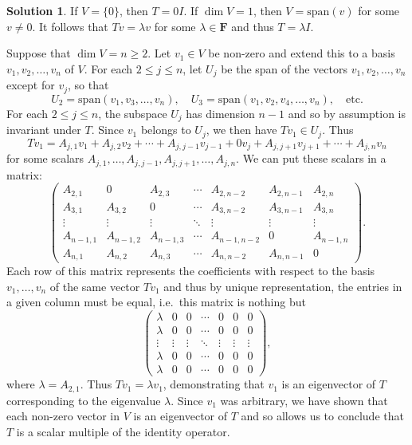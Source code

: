 \documentclass[12pt]{article}
\theoremstyle{definition}
\theoremstyle{exercise}
\theoremstyle{solution}
\newtheorem*{solution}{Solution}
\newcommand{\Span}{\text{span}}
\newcommand{\F}{\mathbf{F}}
\begin{document}
\begin{solution}
    If \( V = \{ 0 \} \), then \( T = 0I \). If \( \dim V = 1 \), then \( V = \Span (v) \) for some \( v \neq 0 \). It follows that \( Tv = \lambda v \) for some \( \lambda \in \F \) and thus \( T = \lambda I \).

    Suppose that \( \dim V = n \geq 2 \). Let \( v_1 \in V \) be non-zero and extend this to a basis \( v_1, v_2, \ldots, v_n \) of \( V \). For each \( 2 \leq j \leq n \), let \( U_j \) be the span of the vectors \( v_1, v_2, \ldots, v_n \) except for \( v_j \), so that
    \[
        U_2 = \Span (v_1, v_3, \ldots, v_n), \quad U_3 = \Span(v_1, v_2, v_4, \ldots, v_n), \quad \text{etc.}
    \]
    For each \( 2 \leq j \leq n \), the subspace \( U_j \) has dimension \( n - 1 \) and so by assumption is invariant under \( T \). Since \( v_1 \) belongs to \( U_j \), we then have \( Tv_1 \in U_j \). Thus
    \[
        Tv_1 = A_{j,1} v_1 + A_{j,2} v_2 + \cdots + A_{j,j-1} v_{j-1} + 0 v_j + A_{j,j+1} v_{j+1} + \cdots + A_{j,n} v_n
    \]
    for some scalars \( A_{j,1}, \ldots, A_{j,j-1}, A_{j,j+1}, \ldots, A_{j,n} \). We can put these scalars in a matrix:
    \[
        \begin{pmatrix}
            A_{2,1} & 0 & A_{2,3} & \cdots & A_{2,n-2} & A_{2,n-1} & A_{2,n} \\
            A_{3,1} & A_{3,2} & 0 & \cdots & A_{3,n-2} & A_{3,n-1} & A_{3,n} \\
            \vdots & \vdots & \vdots & \ddots & \vdots & \vdots & \vdots \\
            A_{n-1,1} & A_{n-1,2} & A_{n-1,3} & \cdots & A_{n-1,n-2} & 0 & A_{n-1,n} \\
            A_{n,1} & A_{n,2} & A_{n,3} & \cdots & A_{n,n-2} & A_{n,n-1} & 0
        \end{pmatrix}.
    \]
    Each row of this matrix represents the coefficients with respect to the basis \( v_1, \ldots, v_n \) of the same vector \( Tv_1 \) and thus by unique representation, the entries in a given column must be equal, i.e.\ this matrix is nothing but
    \[
        \begin{pmatrix}
            \lambda & 0 & 0 & \cdots & 0 & 0 & 0 \\
            \lambda & 0 & 0 & \cdots & 0 & 0 & 0 \\
            \vdots & \vdots & \vdots & \ddots & \vdots & \vdots & \vdots \\
            \lambda & 0 & 0 & \cdots & 0 & 0 & 0 \\
            \lambda & 0 & 0 & \cdots & 0 & 0 & 0
        \end{pmatrix},
    \]
    where \( \lambda = A_{2,1} \). Thus \( Tv_1 = \lambda v_1 \), demonstrating that \( v_1 \) is an eigenvector of \( T \) corresponding to the eigenvalue \( \lambda \). Since \( v_1 \) was arbitrary, we have shown that each non-zero vector in \( V \) is an eigenvector of \( T \) and so  allows us to conclude that \( T \) is a scalar multiple of the identity operator.
\end{solution}
\end{document}
